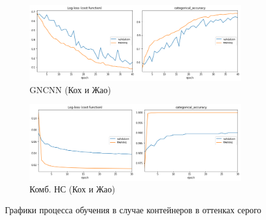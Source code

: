 \begin{figure}[p]
    \centering

    \begin{subfigure}{\textwidth}
        \includegraphics[width=\textwidth]{include/graphics/experimental_plots/grayscale/gncnn_koch}
                    \caption{GNCNN (Кох и Жао)}
    \end{subfigure}

    \begin{subfigure}{\textwidth}
        \includegraphics[width=\textwidth]{include/graphics/experimental_plots/grayscale/mixed_koch}
                    \caption{Комб. НС (Кох и Жао)}
    \end{subfigure}

   \caption{Графики процесса обучения в случае контейнеров в оттенках серого}
    \label{fig:GrayscalePlotsKoch}
\end{figure}

